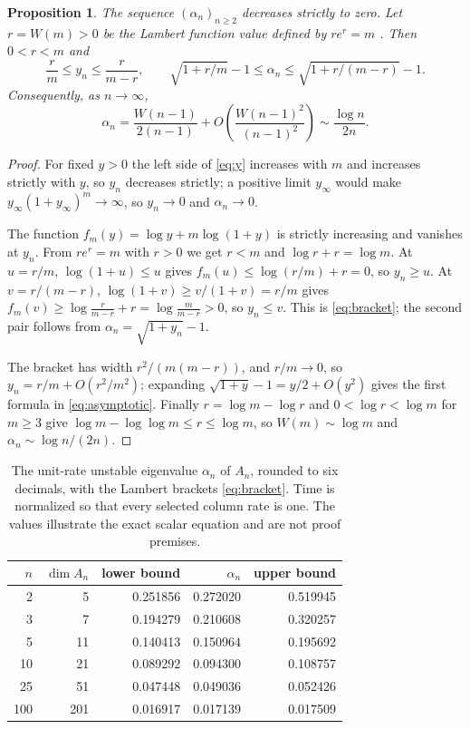 \documentclass[11pt,a4paper]{article}
\theoremstyle{plain}
\newtheorem{proposition}[theorem]{Proposition}
\theoremstyle{definition}
\theoremstyle{remark}
\begin{document}
\begin{proposition}\label{prop:asymptotic}
The sequence $(\alpha_n)_{n\ge2}$ decreases strictly to zero. Let $r=W(m)>0$ be the Lambert function value defined by $re^r=m$ \citep{Corless1996}. Then $0<r<m$ and
\begin{equation}\label{eq:bracket}
\frac rm\le y_n\le\frac r{m-r},\qquad
\sqrt{1+r/m}-1\le\alpha_n\le\sqrt{1+r/(m-r)}-1 .
\end{equation}
Consequently, as $n\to\infty$,
\begin{equation}\label{eq:asymptotic}
\alpha_n=\frac{W(n-1)}{2(n-1)}+O\!\left(\frac{W(n-1)^2}{(n-1)^2}\right)\sim\frac{\log n}{2n}.
\end{equation}
\end{proposition}
\begin{proof}
For fixed $y>0$ the left side of \eqref{eq:y} increases with $m$ and increases strictly with $y$, so $y_n$ decreases strictly; a positive limit $y_\infty$ would make $y_\infty(1+y_\infty)^m\to\infty$, so $y_n\to0$ and $\alpha_n\to0$.

The function $f_m(y)=\log y+m\log(1+y)$ is strictly increasing and vanishes at $y_n$. From $re^r=m$ with $r>0$ we get $r<m$ and $\log r+r=\log m$. At $u=r/m$, $\log(1+u)\le u$ gives $f_m(u)\le\log(r/m)+r=0$, so $y_n\ge u$. At $v=r/(m-r)$, $\log(1+v)\ge v/(1+v)=r/m$ gives $f_m(v)\ge\log\frac{r}{m-r}+r=\log\frac{m}{m-r}>0$, so $y_n\le v$. This is \eqref{eq:bracket}; the second pair follows from $\alpha_n=\sqrt{1+y_n}-1$.

The bracket has width $r^2/(m(m-r))$, and $r/m\to0$, so $y_n=r/m+O(r^2/m^2)$; expanding $\sqrt{1+y}-1=y/2+O(y^2)$ gives the first formula in \eqref{eq:asymptotic}. Finally $r=\log m-\log r$ and $0<\log r<\log m$ for $m\ge3$ give $\log m-\log\log m\le r\le\log m$, so $W(m)\sim\log m$ and $\alpha_n\sim\log n/(2n)$.
\end{proof}

\begin{table}[htbp]\centering
\caption{The unit-rate unstable eigenvalue $\alpha_n$ of $A_n$, rounded to six decimals, with the Lambert brackets \eqref{eq:bracket}. Time is normalized so that every selected column rate is one. The values illustrate the exact scalar equation and are not proof premises.}\label{tab:alpha}
\begin{tabular}{rrrrr}\toprule
$n$&$\dim A_n$&lower bound&$\alpha_n$&upper bound\\\midrule
2&5&0.251856&0.272020&0.519945\\
3&7&0.194279&0.210608&0.320257\\
5&11&0.140413&0.150964&0.195692\\
10&21&0.089292&0.094300&0.108757\\
25&51&0.047448&0.049036&0.052426\\
100&201&0.016917&0.017139&0.017509\\
\bottomrule
\end{tabular}
\end{table}
\end{document}
